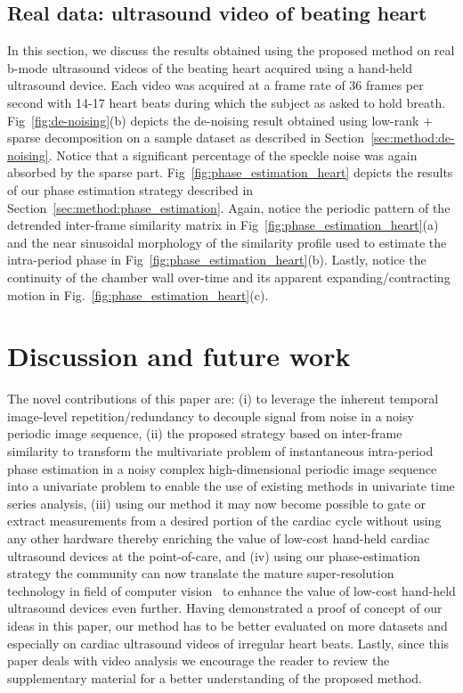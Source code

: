 \documentclass[runningheads,a4paper]{llncs}
\begin{document}
\subsection{Real data: ultrasound video of beating heart}
\label{sec:results:beating_heart}
In this section, we discuss the results obtained using the proposed method on real b-mode ultrasound videos of the beating heart acquired using a hand-held ultrasound device. Each video was acquired at a frame rate of 36 frames per second with 14-17 heart beats during which the subject as asked to hold breath. Fig~\ref{fig:de-noising}(b) depicts the de-noising result obtained using low-rank $+$ sparse decomposition on a sample dataset as described in Section~\ref{sec:method:de-noising}. Notice that a significant percentage of the speckle noise was again absorbed by the sparse part. Fig~\ref{fig:phase_estimation_heart} depicts the results of our phase estimation strategy described in Section~\ref{sec:method:phase_estimation}. Again, notice the periodic pattern of the detrended inter-frame similarity matrix in Fig~\ref{fig:phase_estimation_heart}(a) and the near sinusoidal morphology of the similarity profile used to estimate the intra-period phase in Fig~\ref{fig:phase_estimation_heart}(b). Lastly, notice the continuity of the chamber wall over-time and its apparent expanding/contracting motion in Fig.~\ref{fig:phase_estimation_heart}(c).
\vspace{-0.5cm}
\section{Discussion and future work}
\label{sec:discussion}
The novel contributions of this paper are: (i) to leverage the inherent temporal image-level repetition/redundancy to decouple signal from noise in a noisy periodic image sequence, (ii) the proposed strategy based on inter-frame similarity to transform the multivariate problem of instantaneous intra-period phase estimation in a noisy complex high-dimensional periodic image sequence into a univariate problem to enable the use of existing methods in univariate time series analysis, (iii) using our method it may now become possible to gate or extract measurements from a desired portion of the cardiac cycle without using any other hardware thereby enriching the value of low-cost hand-held cardiac ultrasound devices at the point-of-care, and (iv) using our phase-estimation strategy the community can now translate the mature super-resolution technology in field of computer vision~\cite{Nasrollahi2014} to enhance the value of low-cost hand-held ultrasound devices even further. Having demonstrated a proof of concept of our ideas in this paper, our method has to be better evaluated on more datasets and especially on cardiac ultrasound videos of irregular heart beats. Lastly, since this paper deals with video analysis we encourage the reader to review the supplementary material for a better understanding of the proposed method.
\vspace{-0.5cm}


\end{document}
